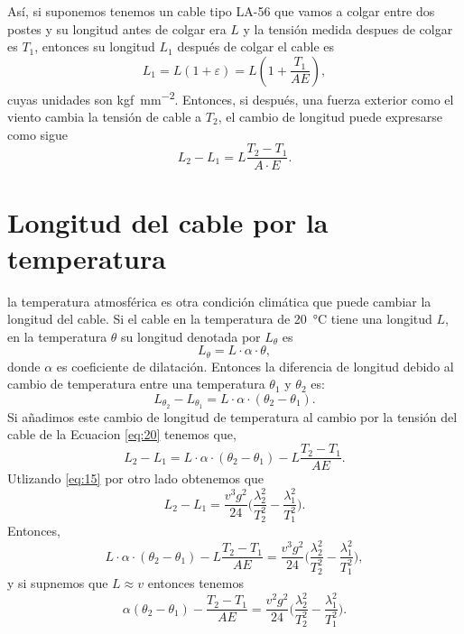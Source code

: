 Así, si suponemos  tenemos un cable tipo LA-56 que vamos a colgar entre
dos postes y su longitud antes de colgar era $L$ y la tensión medida
despues de colgar es $T_1$,  entonces su longitud $L_1$ después de colgar el cable es
\begin{displaymath}
  L_1 = L(1+\varepsilon)=L\left(1+\frac{T_1}{AE}\right),
\end{displaymath}
cuyas unidades son \si{kgf\per mm^2}.
Entonces, si después, una fuerza exterior como el viento cambia la tensión
de cable a $T_2$, el cambio de longitud puede expresarse como sigue
\begin{equation}
 \label{eq:20}
 L_2-L_1=L\frac{T_2-T_1}{A\cdot E}.
\end{equation}

\section{Longitud del cable por la temperatura}

la temperatura atmosférica es otra condición climática que puede cambiar la longitud del cable. Si el cable en la temperatura de \SI{20}{\degreeCelsius}
tiene una longitud $L$, en la temperatura $\theta$ su longitud denotada por $L_{\theta}$ es
\begin{displaymath}
  L_{\theta}=L\cdot\alpha\cdot\theta,
\end{displaymath}
donde $\alpha$ es coeficiente de dilatación. Entonces la diferencia de longitud debido al cambio de temperatura entre una temperatura $\theta_1$ y $\theta_2$ es:
\begin{displaymath}
  L_{\theta_2}-L_{\theta_1} = L\cdot\alpha\cdot(\theta_2-\theta_1).
\end{displaymath}
Si añadimos este cambio de longitud de temperatura al cambio por la tensión del cable de la Ecuacion \eqref{eq:20} tenemos que,
\begin{displaymath}
  L_2-L_1 = L\cdot\alpha\cdot(\theta_2-\theta_1)-L\frac{T_2-T_1}{AE}.
\end{displaymath}
Utlizando \eqref{eq:15} por otro lado obtenemos que
\begin{equation}
  \label{eq:21}
  L_2-L_1=\frac{v^3g^2}{24}\Big(\frac{\lambda_2^2}{T_2^2}-\frac{\lambda_1^2}{T_1^2}\Big).
\end{equation}
Entonces,
\begin{displaymath}
  L\cdot\alpha\cdot(\theta_2-\theta_1)-L\frac{T_2-T_1}{AE}=\frac{v^3g^2}{24}\Big(\frac{\lambda_2^2}{T_2^2}-\frac{\lambda_1^2}{T_1^2}\Big),
\end{displaymath}
y si supnemos que $L\approx{}v$ entonces tenemos
\begin{equation}
  \label{eq:7}
  \alpha(\theta_2-\theta_1)-\frac{T_2-T_1}{AE}
  =\frac{v^2g^2}{24}\Big(\frac{\lambda_2^2}{T_2^2}-\frac{\lambda_1^2}{T_1^2}\Big).
\end{equation}



